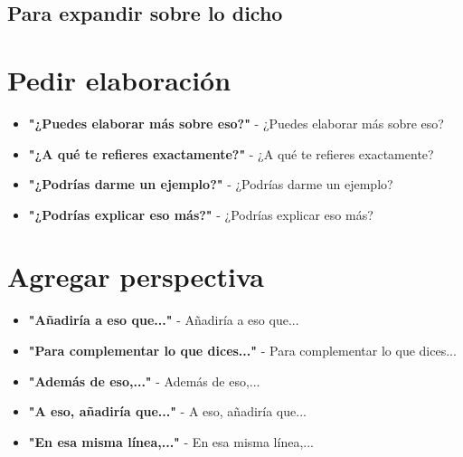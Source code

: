 \documentclass[a4paper,11pt]{article}
\begin{document}
\vspace{0.2cm}

\subsection{Para expandir sobre lo dicho}

\vspace{0.2cm}

\section{Pedir elaboración}

\begin{itemize}

  \item \textbf{"¿Puedes elaborar más sobre eso?"} - ¿Puedes elaborar más sobre eso?

  \item \textbf{"¿A qué te refieres exactamente?"} - ¿A qué te refieres exactamente?

  \item \textbf{"¿Podrías darme un ejemplo?"} - ¿Podrías darme un ejemplo?

  \item \textbf{"¿Podrías explicar eso más?"} - ¿Podrías explicar eso más?

\end{itemize}

\vspace{0.2cm}

\section{Agregar perspectiva}

\begin{itemize}

  \item \textbf{"Añadiría a eso que..."} - Añadiría a eso que...

  \item \textbf{"Para complementar lo que dices..."} - Para complementar lo que dices...

  \item \textbf{"Además de eso,..."} - Además de eso,...

  \item \textbf{"A eso, añadiría que..."} - A eso, añadiría que...

  \item \textbf{"En esa misma línea,..."} - En esa misma línea,...

\end{itemize}
\end{document}
